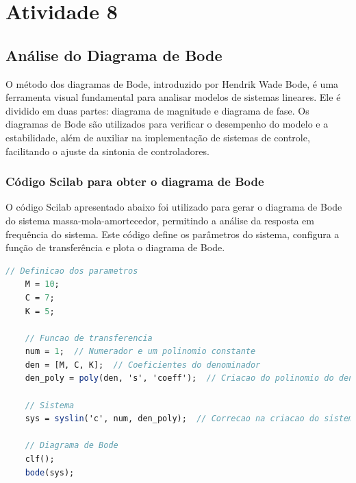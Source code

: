 \section{Atividade 8}

\subsection{Análise do Diagrama de Bode}

O método dos diagramas de Bode, introduzido por Hendrik Wade Bode, é uma ferramenta visual fundamental para analisar modelos de sistemas lineares. Ele é dividido em duas partes: diagrama de magnitude e diagrama de fase. Os diagramas de Bode são utilizados para verificar o desempenho do modelo e a estabilidade, além de auxiliar na implementação de sistemas de controle, facilitando o ajuste da sintonia de controladores.

\subsubsection{Código Scilab para obter o diagrama de Bode}

O código Scilab apresentado abaixo foi utilizado para gerar o diagrama de Bode do sistema massa-mola-amortecedor, permitindo a análise da resposta em frequência do sistema. Este código define os parâmetros do sistema, configura a função de transferência e plota o diagrama de Bode.

\begin{lstlisting}[language=Scilab, caption=Código Scilab para obter o diagrama de Bode]
    // Definicao dos parametros
    M = 10;
    C = 7;
    K = 5;

    // Funcao de transferencia
    num = 1;  // Numerador e um polinomio constante
    den = [M, C, K];  // Coeficientes do denominador
    den_poly = poly(den, 's', 'coeff');  // Criacao do polinomio do denominador

    // Sistema
    sys = syslin('c', num, den_poly);  // Correcao na criacao do sistema

    // Diagrama de Bode
    clf();
    bode(sys);
\end{lstlisting}

